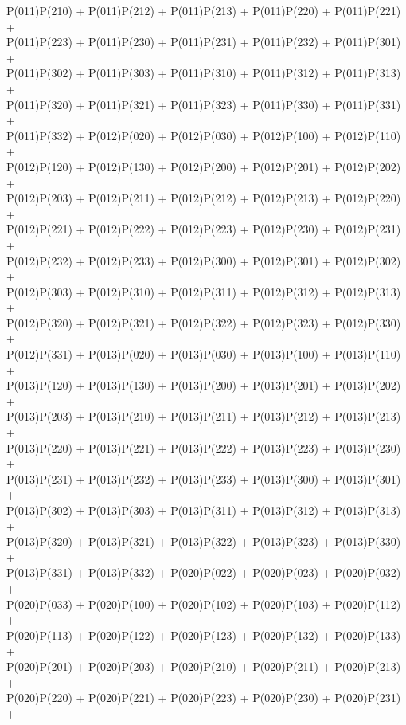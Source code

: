 P(011)P(210) + P(011)P(212) + P(011)P(213) + P(011)P(220) + P(011)P(221) +\\
P(011)P(223) + P(011)P(230) + P(011)P(231) + P(011)P(232) + P(011)P(301) +\\
P(011)P(302) + P(011)P(303) + P(011)P(310) + P(011)P(312) + P(011)P(313) +\\
P(011)P(320) + P(011)P(321) + P(011)P(323) + P(011)P(330) + P(011)P(331) +\\
P(011)P(332) + P(012)P(020) + P(012)P(030) + P(012)P(100) + P(012)P(110) +\\
P(012)P(120) + P(012)P(130) + P(012)P(200) + P(012)P(201) + P(012)P(202) +\\
P(012)P(203) + P(012)P(211) + P(012)P(212) + P(012)P(213) + P(012)P(220) +\\
P(012)P(221) + P(012)P(222) + P(012)P(223) + P(012)P(230) + P(012)P(231) +\\
P(012)P(232) + P(012)P(233) + P(012)P(300) + P(012)P(301) + P(012)P(302) +\\
P(012)P(303) + P(012)P(310) + P(012)P(311) + P(012)P(312) + P(012)P(313) +\\
P(012)P(320) + P(012)P(321) + P(012)P(322) + P(012)P(323) + P(012)P(330) +\\
P(012)P(331) + P(013)P(020) + P(013)P(030) + P(013)P(100) + P(013)P(110) +\\
P(013)P(120) + P(013)P(130) + P(013)P(200) + P(013)P(201) + P(013)P(202) +\\
P(013)P(203) + P(013)P(210) + P(013)P(211) + P(013)P(212) + P(013)P(213) +\\
P(013)P(220) + P(013)P(221) + P(013)P(222) + P(013)P(223) + P(013)P(230) +\\
P(013)P(231) + P(013)P(232) + P(013)P(233) + P(013)P(300) + P(013)P(301) +\\
P(013)P(302) + P(013)P(303) + P(013)P(311) + P(013)P(312) + P(013)P(313) +\\
P(013)P(320) + P(013)P(321) + P(013)P(322) + P(013)P(323) + P(013)P(330) +\\
P(013)P(331) + P(013)P(332) + P(020)P(022) + P(020)P(023) + P(020)P(032) +\\
P(020)P(033) + P(020)P(100) + P(020)P(102) + P(020)P(103) + P(020)P(112) +\\
P(020)P(113) + P(020)P(122) + P(020)P(123) + P(020)P(132) + P(020)P(133) +\\
P(020)P(201) + P(020)P(203) + P(020)P(210) + P(020)P(211) + P(020)P(213) +\\
P(020)P(220) + P(020)P(221) + P(020)P(223) + P(020)P(230) + P(020)P(231) +\\

